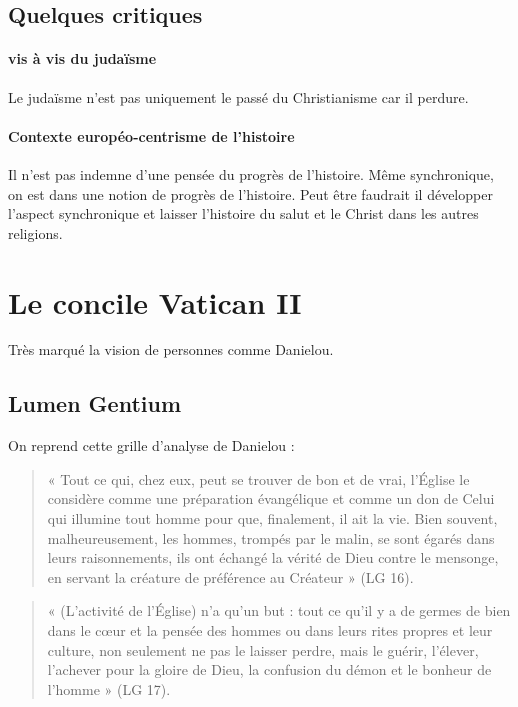 \subsection{Quelques critiques}

\paragraph{vis à vis du judaïsme} Le judaïsme n'est pas uniquement le passé du Christianisme car il perdure.

\paragraph{Contexte européo-centrisme de l'histoire} Il n'est pas indemne d'une pensée du progrès de l'histoire. Même synchronique, on est dans une notion de progrès de l'histoire.
Peut être faudrait il développer l'aspect synchronique et laisser l'histoire du salut et le Christ dans les autres religions.


\section{Le concile Vatican II }

Très marqué la vision de personnes comme Danielou.

\subsection{Lumen Gentium}  
On reprend cette grille d'analyse de Danielou : 
\begin{quote}
    « Tout ce qui, chez eux, peut se trouver de bon et de vrai, l’Église le considère comme une préparation évangélique et comme un don de Celui qui illumine tout homme pour que, finalement, il ait la vie. Bien souvent, malheureusement, les hommes, trompés par le malin, se sont égarés dans leurs raisonnements, ils ont échangé la vérité de Dieu contre le mensonge, en servant la créature de préférence au Créateur » (LG 16). 
\end{quote}

\begin{quote}
    « (L’activité de l’Église) n’a qu’un but : tout ce qu’il y a de germes de bien dans le cœur et la pensée des hommes ou dans leurs rites propres et leur culture, non seulement ne pas le laisser perdre, mais le guérir, l’élever, l’achever pour la gloire de Dieu, la confusion du démon et le bonheur de l’homme » (LG 17). 
\end{quote}

